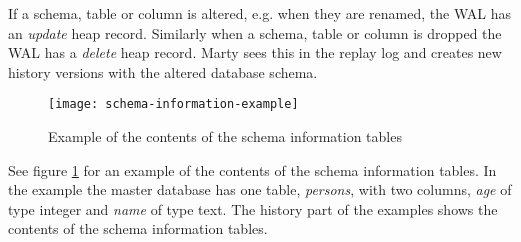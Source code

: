 If a schema, table or column is altered, e.g. when they are renamed, the WAL has an \textit{update} heap record.
Similarly when a schema, table or column is dropped the WAL has a \textit{delete} heap record.
Marty sees this in the replay log and creates new history versions with the altered database schema.

\begin{figure}[h!]
  \centering
    \texttt{[image: schema-information-example]}
  \caption{Example of the contents of the schema information tables}
  \label{fig:schema-information-example}
\end{figure}

See figure \ref{fig:schema-information-example} for an example of the contents of the schema information tables.
In the example the master database has one table, \textit{persons}, with two columns, \textit{age} of type integer and \textit{name} of type text.
The history part of the examples shows the contents of the schema information tables.

